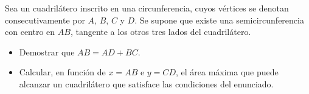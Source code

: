 Sea un cuadrilátero inscrito en una circunferencia, cuyos vértices se denotan consecutivamente por $A$, $B$, $C$ y $D$. Se supone que existe una semicircunferencia con centro en $AB$, tangente a los otros tres lados del cuadrilátero.
 \begin{itemize} 
 \item Demostrar que $AB=AD+BC$.
 \item Calcular, en función de $x=AB$ e $y=CD$, el área máxima que puede alcanzar un cuadrilátero que satisface las condiciones del enunciado.
 \end{itemize} 
